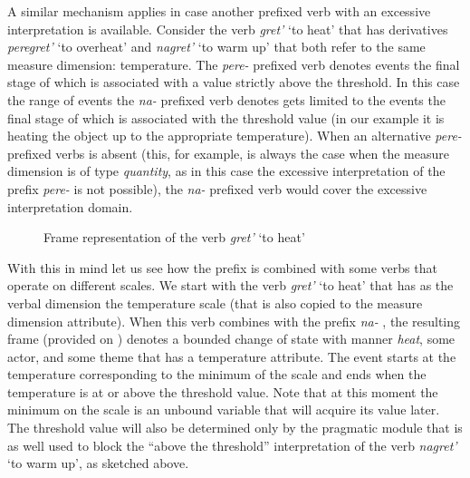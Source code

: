 A similar mechanism applies in case another prefixed verb with an excessive  interpretation is available. Consider the verb \textit{gret'} `to heat' that has derivatives \textit{peregret'} `to overheat' and \textit{nagret'} `to warm up' that both refer to the same measure dimension: temperature. The \textit{pere-}  prefixed verb denotes events the final stage of which is associated with a value strictly above the threshold. In this case the range of events the \textit{na-}  prefixed verb denotes gets limited to the events the final stage of which is associated with the threshold value (in our example it is heating the object up to the appropriate temperature). When an alternative \textit{pere-}  prefixed verbs is absent (this, for example, is always the case when the measure dimension is of type \textit{quantity}, as in this case the excessive  interpretation of the prefix \textit{pere-}   is not possible), the \textit{na-}  prefixed verb would cover the excessive  interpretation domain. 

\begin{figure}
\centering
{}
\caption{Frame representation of the verb \textit{gret'} `to heat' \label{frame:heat}}
\end{figure}

With this in mind let us see how the prefix is combined with some verbs that operate on different scales. We start with the verb \textit{gret'} `to heat' that has as the verbal dimension the temperature scale (that is also copied to the measure dimension attribute). When this verb combines with the prefix \textit{na-}  , the resulting frame (provided on ) denotes a bounded change of state with manner \textit{heat}, some actor, and some theme that has a temperature attribute. The event starts at the temperature corresponding to the minimum of the scale and ends when the temperature is at or above the threshold value. Note that at this moment the minimum on the scale is an unbound variable that will acquire its value later. The threshold value will also be determined only by the pragmatic module that is as well used to block the ``above the threshold'' interpretation of the verb \textit{nagret'} `to warm up', as sketched above.

